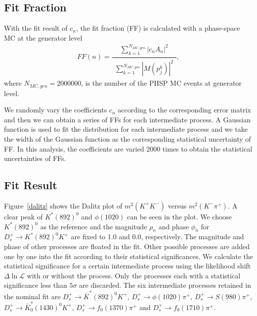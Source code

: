 \documentclass[aps,prd,twocolumn,showpacs,amsmath,amssymb]{revtex4-1}
\begin{document}
\subsection{Fit Fraction}
\label{FF}
With the fit result of $c_{n}$, the fit fraction (FF) is calculated with a phase-space MC at the generator level
\begin{equation}
FF(n) = \frac{\begin{matrix}\sum_{k=1}^{N_{MC,gen}} \left|c_{n}A_{n}\right|^{2}\end{matrix}}{\begin{matrix}\sum_{k=1}^{N_{MC,gen}} \left|M(p_{j}^{k})\right|^{2}\end{matrix}}, \label{Fit-Fraction-Definition}
\end{equation}
where $N_{MC,gen} = 2000000$, is the number of the PHSP MC events at generator level. 

We randomly vary the coefficients $c_{n}$ according to the corresponding error matrix and then we can obtain a series of FFs for  each intermediate process.
A Gaussian function is used to fit the distribution for each intermediate process and we take the width of the Gaussian function as the corresponding statistical uncertainty of FF. 
In this analysis, the coefficients are varied 2000 times to obtain the statistical uncertainties of FFs.

\subsection{Fit Result}
\label{AA-FitResult}
Figure~\ref{dalitz} shows the Dalitz plot of $m^{2}(K^{+}K^{-})$ versus $m^{2}(K^{-}\pi^{+})$.
A clear peak of $K^{*}(892)^{0}$ and $\phi(1020)$ can be seen in the plot.
We choose $K^{*}(892)^{0}$ as the reference and 
the magnitude  $\rho_{n}$ and  phase $\phi_{n}$ for $D_{s}^{+} \rightarrow K^{*}(892)^{0}K^{+}$ are fixed to 1.0 and 0.0, respectively.
The magnitude and phase of other processes are floated in the fit.
Other possible processes are added one by one into the fit according to their statistical significances.
We calculate the statistical significance for a certain intermediate process using the likelihood shift $\Delta \ln \mathcal{L}$ with or without the process.
Only the processes each with a statistical significance less than $5\sigma$ are discarded.
The six intermediate processes retained in the nominal fit are  
$D_{s}^{+} \rightarrow \bar{K}^{*}(892)^{0}K^{+}$,
$D_{s}^{+} \rightarrow \phi(1020)\pi^{+}$,
$D_{s}^{+} \rightarrow S(980)\pi^{+}$,
$D_{s}^{+} \rightarrow \bar{K}^{*}_{0}(1430)^{0}K^{+}$,
$D_{s}^{+} \rightarrow f_{0}(1370)\pi^{+}$ and
$D_{s}^{+} \rightarrow f_{0}(1710)\pi^{+}$. 
\end{document}
